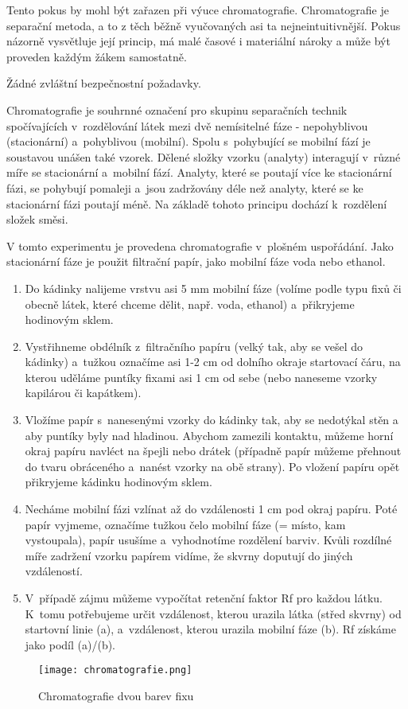 
Tento pokus by mohl být zařazen při výuce chromatografie. Chromatografie je separační metoda, a to z těch běžně vyučovaných asi ta nejneintuitivnější. Pokus názorně vysvětluje její princip, má malé časové i materiální nároky a může být proveden každým žákem samostatně.\\

\hspace{-21pt} 

Žádné zvláštní bezpečnostní požadavky.\\

\hspace{-21pt} 

Chromatografie je souhrnné označení pro skupinu separačních technik spočívajících v~rozdělování látek mezi dvě nemísitelné fáze - nepohyblivou (stacionární) a~pohyblivou (mobilní). Spolu s~pohybující se mobilní fází je soustavou unášen také vzorek. Dělené složky vzorku (analyty) interagují v~různé míře se stacionární a~mobilní fází. Analyty, které se poutají více ke stacionární fázi, se pohybují pomaleji a~jsou zadržovány déle než analyty, které se ke stacionární fázi poutají méně. Na základě tohoto principu dochází k~rozdělení složek směsi.

V tomto experimentu je provedena chromatografie v~plošném uspořádání. Jako stacionární fáze je použit filtrační papír, jako mobilní fáze voda nebo ethanol. \newline

\hspace{-21pt} 

\begin{enumerate}
\item Do kádinky nalijeme vrstvu asi 5 mm mobilní fáze (volíme podle typu fixů či obecně látek, které chceme dělit, např. voda, ethanol) a~přikryjeme hodinovým sklem.
\item Vystřihneme obdélník z~filtračního papíru (velký tak, aby se vešel do kádinky) a~tužkou označíme asi 1-2 cm od dolního okraje startovací čáru, na kterou uděláme puntíky fixami asi 1 cm od sebe (nebo naneseme vzorky kapilárou či kapátkem).
\item Vložíme papír s~nanesenými vzorky do kádinky tak, aby se nedotýkal stěn a aby puntíky byly nad hladinou.  Abychom zamezili kontaktu, můžeme horní okraj papíru navléct na špejli nebo drátek (případně papír můžeme přehnout do tvaru obráceného  a~nanést vzorky na obě strany). Po vložení papíru opět přikryjeme kádinku hodinovým sklem.
\item Necháme mobilní fázi vzlínat až do vzdálenosti 1 cm pod okraj papíru. Poté papír vyjmeme, označíme tužkou čelo mobilní fáze (= místo, kam vystoupala), papír usušíme a~vyhodnotíme rozdělení barviv. Kvůli rozdílné míře zadržení vzorku papírem vidíme, že skvrny doputují do jiných vzdáleností.
\item V~případě zájmu můžeme vypočítat retenční faktor Rf pro každou látku. K~tomu potřebujeme určit vzdálenost, kterou urazila látka (střed skvrny) od startovní linie (a), a~vzdálenost, kterou urazila mobilní fáze (b). Rf získáme jako podíl (a)/(b).
\end{enumerate}

\begin{figure}[h!]
    \centering
    \texttt{[image: chromatografie.png]}
    \caption{Chromatografie dvou barev fixu}
\end{figure}
